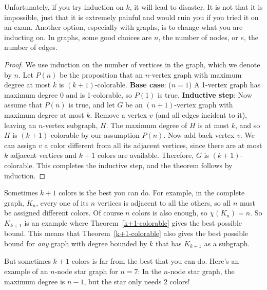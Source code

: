 Unfortunately, if you try induction on $k$, it will lead to disaster.  It
is not that it is impossible, just that it is extremely painful and would
ruin you if you tried it on an exam.  Another option, especially with
graphs, is to change what you are inducting on.  In graphs, some good
choices are $n$, the number of nodes, or $e$, the number of edges.

\begin{proof}
We use induction on the number of vertices in the graph, which we
denote by $n$.  Let $P(n)$ be the proposition that an $n$-vertex graph
with maximum degree at most $k$ is $(k+1)$-colorable.
\textbf{Base case}: ($n=1$) A 1-vertex graph has maximum degree 0 and is
1-colorable, so $P(1)$ is true.
\textbf{Inductive step}: Now assume that $P(n)$ is true, and let $G$ be an
$(n+1)$-vertex graph with maximum degree at most $k$.  Remove a vertex $v$
(and all edges incident to it), leaving an $n$-vertex subgraph, $H$.  The
maximum degree of $H$ is at most $k$, and so $H$ is $(k+1)$-colorable by
our assumption $P(n)$.  Now add back vertex $v$.  We can assign $v$ a
color different from all its adjacent vertices, since there are at
most $k$ adjacent vertices and $k+1$ colors are available.  Therefore, $G$
is $(k+1)$-colorable.  This completes the inductive step, and the theorem
follows by induction.
\end{proof}

Sometimes $k+1$ colors is the best you can do.  For example, in the
complete graph, $K_n$, every one of its $n$ vertices is adjacent to all
the others, so all $n$ must be assigned different colors.  Of course $n$
colors is also enough, so $\chi(K_n)=n$.  So $K_{k+1}$ is an example where
Theorem~\ref{k+1-colorable} gives the best possible bound.  This means
that Theorem~\ref{k+1-colorable} also gives the best possible bound for
\emph{any} graph with degree bounded by $k$ that has $K_{k+1}$ as a
subgraph.

But sometimes $k+1$ colors is far from the best that you can do.  Here's
an example of an $n$-node star graph for $n=7$:
In the $n$-node star graph, the maximum degree is $n-1$, but the star only
needs $2$ colors!

